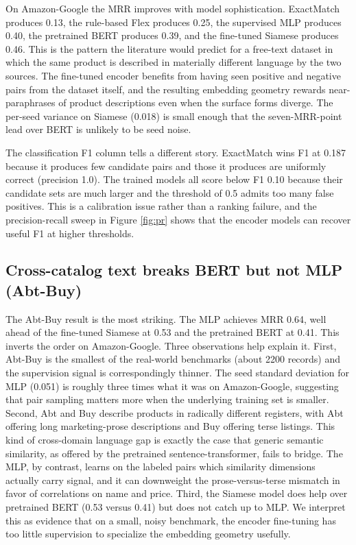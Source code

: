 \documentclass[10pt,letterpaper]{article}
\begin{document}
On Amazon-Google the MRR improves with model sophistication. ExactMatch
produces 0.13, the rule-based Flex produces 0.25, the supervised MLP
produces 0.40, the pretrained BERT produces 0.39, and the fine-tuned
Siamese produces 0.46. This is the pattern the literature would
predict for a free-text dataset in which the same product is described
in materially different language by the two sources. The fine-tuned
encoder benefits from having seen positive and negative pairs from the
dataset itself, and the resulting embedding geometry rewards
near-paraphrases of product descriptions even when the surface forms
diverge. The per-seed variance on Siamese (0.018) is small enough that
the seven-MRR-point lead over BERT is unlikely to be seed noise.

The classification F1 column tells a different story. ExactMatch wins
F1 at 0.187 because it produces few candidate pairs and those it
produces are uniformly correct (precision 1.0). The trained models all
score below F1 0.10 because their candidate sets are much larger and
the threshold of 0.5 admits too many false positives. This is a
calibration issue rather than a ranking failure, and the
precision-recall sweep in Figure \ref{fig:pr} shows that the encoder
models can recover useful F1 at higher thresholds.

\subsection{Cross-catalog text breaks BERT but not MLP (Abt-Buy)}

The Abt-Buy result is the most striking. The MLP achieves MRR 0.64,
well ahead of the fine-tuned Siamese at 0.53 and the pretrained BERT
at 0.41. This inverts the order on Amazon-Google. Three observations
help explain it. First, Abt-Buy is the smallest of the real-world
benchmarks (about 2200 records) and the supervision signal is
correspondingly thinner. The seed standard deviation for MLP (0.051)
is roughly three times what it was on Amazon-Google, suggesting that
pair sampling matters more when the underlying training set is
smaller. Second, Abt and Buy describe products in radically different
registers, with Abt offering long marketing-prose descriptions and
Buy offering terse listings. This kind of cross-domain language gap
is exactly the case that generic semantic similarity, as offered by
the pretrained sentence-transformer, fails to bridge. The MLP, by
contrast, learns on the labeled pairs which similarity dimensions
actually carry signal, and it can downweight the prose-versus-terse
mismatch in favor of correlations on name and price. Third, the
Siamese model does help over pretrained BERT (0.53 versus 0.41) but
does not catch up to MLP. We interpret this as evidence that on a
small, noisy benchmark, the encoder fine-tuning has too little
supervision to specialize the embedding geometry usefully.
\end{document}
